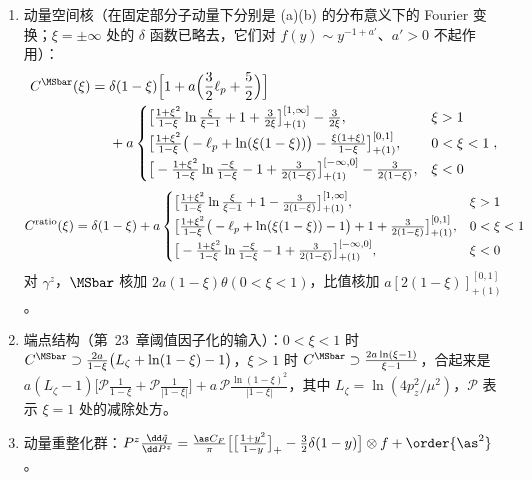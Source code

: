\begin{proposition}
\begin{enumerate}[label=(\alph*),leftmargin=2em,itemsep=2pt,topsep=2pt]
\item 动量空间核（在固定部分子动量下分别是 (a)(b) 的分布意义下的 Fourier 变换；$\xi=\pm\infty$ 处的 $\delta$ 函数已略去，它们对 $f(y)\sim y^{-1+a'}$、$a'>0$ 不起作用）：
\begin{equation}\label{eq:lamet-CMS}
\begin{split}
C^{\MSbar}(\xi)={}&\delta(1-\xi)\Big[1+a\Big(\frac32\ell_p+\frac52\Big)\Big]\\
&+a\begin{cases}\big[\frac{1+\xi^2}{1-\xi}\ln\frac\xi{\xi-1}+1+\frac3{2\xi}\big]^{[1,\infty]}_{+(1)}-\frac3{2\xi},&\xi>1\\[3pt]\big[\frac{1+\xi^2}{1-\xi}\big(-\ell_p+\ln(\xi(1-\xi))\big)-\frac{\xi(1+\xi)}{1-\xi}\big]^{[0,1]}_{+(1)},&0<\xi<1\\[3pt]\big[-\frac{1+\xi^2}{1-\xi}\ln\frac{-\xi}{1-\xi}-1+\frac3{2(1-\xi)}\big]^{[-\infty,0]}_{+(1)}-\frac3{2(1-\xi)},&\xi<0\end{cases},
\end{split}
\end{equation}
\begin{equation}\label{eq:lamet-Cratio}
C^{\rm ratio}(\xi)=\delta(1-\xi)+a\begin{cases}\big[\frac{1+\xi^2}{1-\xi}\ln\frac\xi{\xi-1}+1-\frac3{2(1-\xi)}\big]^{[1,\infty]}_{+(1)},&\xi>1\\[3pt]\big[\frac{1+\xi^2}{1-\xi}\big(-\ell_p+\ln(\xi(1-\xi))-1\big)+1+\frac3{2(1-\xi)}\big]^{[0,1]}_{+(1)},&0<\xi<1\\[3pt]\big[-\frac{1+\xi^2}{1-\xi}\ln\frac{-\xi}{1-\xi}-1+\frac3{2(1-\xi)}\big]^{[-\infty,0]}_{+(1)},&\xi<0\end{cases}
\end{equation}%
对 $\gamma^z$，$\MSbar$ 核加 $2a(1-\xi)\theta(0<\xi<1)$，比值核加 $a[2(1-\xi)]^{[0,1]}_{+(1)}$。
\item 端点结构（第~23~章阈值因子化的输入）：$0<\xi<1$ 时 $C^{\MSbar}\supset\frac{2a}{1-\xi}\big(L_\zeta+\ln(1-\xi)-1\big)$，$\xi>1$ 时 $C^{\MSbar}\supset\frac{2a\ln(\xi-1)}{\xi-1}$，合起来是
$a(L_\zeta-1)\big[\mathcal P\frac1{1-\xi}+\mathcal P\frac1{|1-\xi|}\big]+a\,\mathcal P\frac{\ln(1-\xi)^2}{|1-\xi|}$，其中 $L_\zeta=\ln(4p_z^2/\mu^2)$，$\mathcal P$ 表示 $\xi=1$ 处的减除处方。
\item 动量重整化群：$P^z\frac{\dd\tilde q}{\dd P^z}=\frac{\as C_F}\pi\big[\big[\frac{1+y^2}{1-y}\big]_+-\frac32\delta(1-y)\big]\otimes f+\order{\as^2}$。
\end{enumerate}
\end{proposition}

